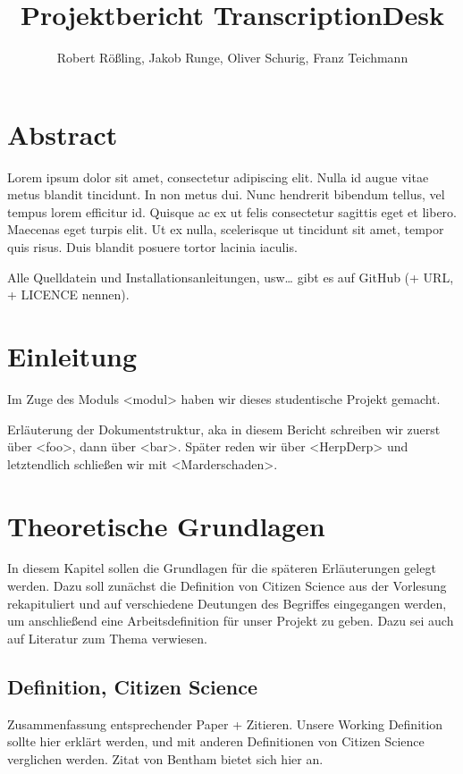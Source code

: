 \documentclass{article}
\title{Projektbericht TranscriptionDesk}
\author{Robert Rößling, Jakob Runge, Oliver Schurig, Franz Teichmann}
\begin{document}

\maketitle

\section*{Abstract}
Lorem ipsum dolor sit amet, consectetur adipiscing elit. Nulla id augue vitae metus blandit tincidunt. In non metus dui. Nunc hendrerit bibendum tellus, vel tempus lorem efficitur id. Quisque ac ex ut felis consectetur sagittis eget et libero. Maecenas eget turpis elit. Ut ex nulla, scelerisque ut tincidunt sit amet, tempor quis risus. Duis blandit posuere tortor lacinia iaculis.

Alle Quelldatein und Installationsanleitungen, usw… gibt es auf GitHub (+ URL, + LICENCE nennen).

\tableofcontents
\newpage
\section{Einleitung}
Im Zuge des Moduls <modul> haben wir dieses studentische Projekt gemacht.

Erläuterung der Dokumentstruktur, aka in diesem Bericht schreiben wir zuerst über <foo>, dann über <bar>.
Später reden wir über <HerpDerp> und letztendlich schließen wir mit <Marderschaden>.
\section{Theoretische Grundlagen}
In diesem Kapitel sollen die Grundlagen für die späteren Erläuterungen gelegt werden. Dazu soll zunächst die Definition von Citizen Science aus der Vorlesung rekapituliert und auf verschiedene Deutungen des Begriffes eingegangen werden, um anschließend eine Arbeitsdefinition für unser Projekt zu geben. Dazu sei auch auf Literatur zum Thema verwiesen.
\subsection{Definition, Citizen Science}
Zusammenfassung entsprechender Paper + Zitieren.
Unsere Working Definition sollte hier erklärt werden,
und mit anderen Definitionen von Citizen Science verglichen werden.
Zitat von Bentham bietet sich hier an.
\end{document}
